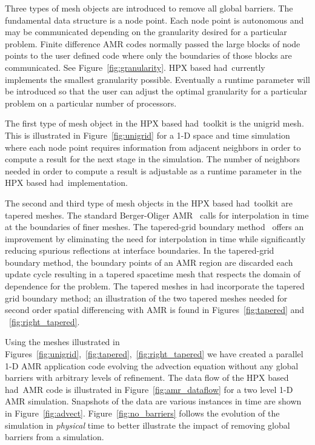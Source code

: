 \documentclass[prd,aps,showpacs,nofootinbib,floats,floatfix,twocolumn,letterpaper]{revtex4}
\newcommand{\had}{{\sc had}}
\begin{document}
Three types of mesh objects are introduced to remove all global barriers.  The fundamental
data structure is a node point.  Each node point is autonomous and may be communicated
depending on the granularity desired for a particular problem.  
Finite difference AMR codes normally passed the large blocks of node points to the user defined
code where only the boundaries of those blocks are communicated.  See Figure~\ref{fig:granularity}.
HPX based \had\ currently implements the smallest granularity possible.  Eventually 
a runtime parameter will be introduced so that the user can adjust the optimal granularity for a
particular problem on a particular number of processors.  

The first type of mesh object in the HPX based \had\ toolkit is the unigrid mesh.  This is illustrated
 in Figure~\ref{fig:unigrid} for a 1-D space and time simulation where each node point requires information
from adjacent neighbors in order to compute a result for the next stage in the simulation.
The number of neighbors needed in order to compute a result is adjustable as a runtime parameter 
in the HPX based \had\ implementation.

The second and third type of mesh objects in the HPX based \had\ toolkit are tapered meshes.
The standard Berger-Oliger AMR~\cite{Berger} calls for interpolation in time at the boundaries
of finer meshes.  The tapered-grid boundary method~\cite{Lehner:2005vc}   
offers an improvement by eliminating the need for interpolation in time while significantly
reducing spurious reflections at interface boundaries.  In the tapered-grid boundary method, the boundary points
of an AMR region are discarded each update cycle resulting in a tapered spacetime mesh that respects the domain of
dependence for the problem.  The tapered meshes in \had
incorporate the tapered grid boundary method; an illustration of the two tapered meshes
needed for second order spatial differencing with AMR is found in Figures~\ref{fig:tapered} and ~\ref{fig:right_tapered}.

Using the meshes illustrated in Figures~\ref{fig:unigrid},~\ref{fig:tapered},~\ref{fig:right_tapered} we have created
a parallel 1-D AMR application code evolving the advection equation without any global barriers with arbitrary 
levels of refinement.  The data flow of the HPX based \had\ AMR code is illustrated in Figure~\ref{fig:amr_dataflow} 
for a two level 1-D AMR simulation.   Snapshots of the data are various instances in time are shown in 
Figure~\ref{fig:advect}.  Figure~\ref{fig:no_barriers} follows the evolution of the simulation in {\it physical} time
to better illustrate the impact of removing global barriers from a simulation.
\end{document}
